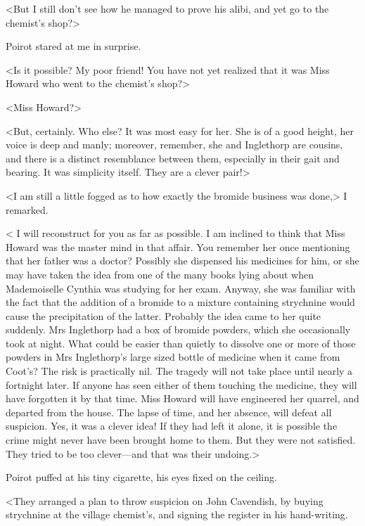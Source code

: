  <But I still don't see how he managed to prove his alibi, and yet go to the chemist's shop?> 

 Poirot stared at me in surprise. 

 <Is it possible? My poor friend! You have not yet realized that it was Miss Howard who went to the chemist's shop?> 

 <Miss Howard?> 

 <But, certainly. Who else? It was most easy for her. She is of a good height, her voice is deep and manly; moreover, remember, she and Inglethorp are cousins, and there is a distinct resemblance between them, especially in their gait and bearing. It was simplicity itself. They are a clever pair!> 

 <I am still a little fogged as to how exactly the bromide business was done,> I remarked. 

 < I will reconstruct for you as far as possible. I am inclined to think that Miss Howard was the master mind in that affair. You remember her once mentioning that her father was a doctor? Possibly she dispensed his medicines for him, or she may have taken the idea from one of the many books lying about when Mademoiselle Cynthia was studying for her exam. Anyway, she was familiar with the fact that the addition of a bromide to a mixture containing strychnine would cause the precipitation of the latter. Probably the idea came to her quite suddenly. Mrs Inglethorp had a box of bromide powders, which she occasionally took at night. What could be easier than quietly to dissolve one or more of those powders in Mrs Inglethorp's large sized bottle of medicine when it came from Coot's? The risk is practically nil. The tragedy will not take place until nearly a fortnight later. If anyone has seen either of them touching the medicine, they will have forgotten it by that time. Miss Howard will have engineered her quarrel, and departed from the house. The lapse of time, and her absence, will defeat all suspicion. Yes, it was a clever idea! If they had left it alone, it is possible the crime might never have been brought home to them. But they were not satisfied. They tried to be too clever—and that was their undoing.> 

 Poirot puffed at his tiny cigarette, his eyes fixed on the ceiling. 

 <They arranged a plan to throw suspicion on John Cavendish, by buying strychnine at the village chemist's, and signing the register in his hand-writing. 

